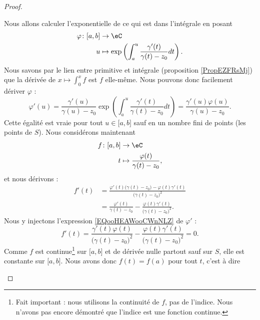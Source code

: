 \begin{proof}
\begin{subproof}
		Nous allons calculer l'exponentielle de ce qui est dans l'intégrale en posant
		\begin{equation}
			\begin{aligned}
				\varphi\colon \mathopen[ a,b\mathclose] & \to \eC                                                                    \\
				u                                       & \mapsto \exp\left( \int_a^u\frac{ \gamma'(t) }{ \gamma(t)-z_0 }dt \right).
			\end{aligned}
		\end{equation}
		Nous savons par le lien entre primitive et intégrale (proposition \ref{PropEZFRsMj}) que la dérivée de \( x\mapsto \int_0^xf\) est \( f\) elle-même. Nous pouvons donc facilement dériver \( \varphi\) :
		\begin{equation}		\label{EQooHEAWooCWnNLZ}
			\varphi'(u)=\frac{ \gamma'(u) }{ \gamma(u)-z_0 }\exp\left(\int_a^u\frac{ \gamma'(t) }{ \gamma(t)-z_0 }dt\right)=\frac{ \gamma'(u)\varphi(u) }{ \gamma(u)-z_0 }.
		\end{equation}
		Cette égalité est vraie pour tout \( u\in\mathopen[ a,b\mathclose]\) sauf en un nombre fini de points (les points de \( S\)). Nous considérons maintenant
		\begin{equation}
			\begin{aligned}
				f\colon \mathopen[ a,b\mathclose] & \to \eC                                       \\
				t                                 & \mapsto \frac{ \varphi(t) }{ \gamma(t)-z_0 },
			\end{aligned}
		\end{equation}
		et nous dérivons :
		\begin{subequations}
			\begin{align}
				f'(t) & =\frac{ \varphi'(t)\big( \gamma(t)-z_0 \big) -\varphi(t)\gamma'(t) }{ \big( \gamma(t)-z_0 \big)^2 } \\
				      & =\frac{ \varphi'(t) }{ \gamma(t)-z_0 }-\frac{\varphi(t)\gamma'(t) }{ \big( \gamma(t)-z_0 \big)^2 }.
			\end{align}
		\end{subequations}
		Nous y injectons l'expression \eqref{EQooHEAWooCWnNLZ} de \( \varphi'\) :
		\begin{equation}
			f'(t)=\frac{ \gamma'(t)\varphi(t) }{ \big( \gamma(t)-z_0 \big)^2 }-\frac{ \varphi(t)\gamma'(t) }{ \big( \gamma(t)-z_0 \big)^2 }=0.
		\end{equation}
		Comme \( f\) est continue\footnote{Fait important : nous utilisons la continuité de \( f\), pas de l'indice. Nous n'avons pas encore démontré que l'indice est une fonction continue.} sur \( \mathopen[ a,b\mathclose]\) et de dérivée nulle partout sauf sur \( S\), elle est constante sur \( \mathopen[ a,b\mathclose]\). Nous avons donc \( f(t)=f(a)\) pour tout \( t\), c'est à dire

\end{subproof}
\end{proof}
